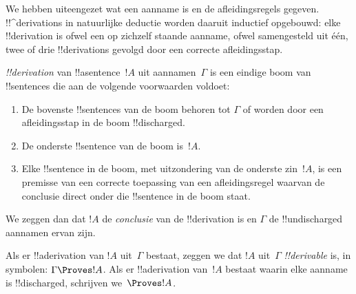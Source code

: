 \documentclass[openany]{memoir}
\begin{document}
\begingroup
\def\olfilename{OLP-0088}
\def\olfilepath{content/first-order-logic/natural-deduction/}
\hypertarget{unit-OLP-0088}{}



      {}
      {}


\begin{explain}
We hebben uiteengezet wat een aanname is en de afleidingsregels
gegeven. !!^{derivation}s in natuurlijke deductie worden daaruit
inductief opgebouwd: elke !!{derivation} is ofwel een op zichzelf
staande aanname, ofwel samengesteld uit één, twee of drie
!!{derivation}s gevolgd door een correcte afleidingsstap.
\end{explain}

\begin{defn}[!!^{derivation}]
 \emph{!!{derivation}} van !!a{sentence}~$!A$ uit
aannamen~$\Gamma$ is een eindige boom van !!{sentence}s die aan de
volgende voorwaarden voldoet:
\begin{enumerate}
\item De bovenste !!{sentence}s van de boom behoren tot $\Gamma$ of
  worden door een afleidingsstap in de boom !!{discharged}.
\item De onderste !!{sentence} van de boom is~$!A$.
\item Elke !!{sentence} in de boom, met uitzondering van de onderste
  zin~$!A$, is een premisse van een correcte toepassing van een
  afleidingsregel waarvan de conclusie direct onder die !!{sentence}
  in de boom staat.
\end{enumerate}
We zeggen dan dat $!A$ de \emph{conclusie} van de !!{derivation} is en
$\Gamma$ de !!{undischarged} aannamen ervan zijn.

Als er !!a{derivation} van $!A$ uit~$\Gamma$ bestaat, zeggen we dat
$!A$ uit~$\Gamma$ \emph{!!{derivable}} is, in symbolen: $\Gamma
\Proves !A$. Als er !!a{derivation} van~$!A$ bestaat waarin elke
aanname is !!{discharged}, schrijven we~$\Proves !A$.
\end{defn}
\end{document}
